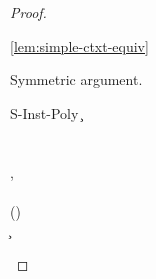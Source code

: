 \documentclass[acmsmall,screen,nonacm%
\Anonymous{,anonymous}{}%
\Final{}{,review}%
]{acmart}
\providecommand{\DIFaddbegin}{} %
\providecommand{\DIFaddend}{} %
\providecommand{\DIFdelbegin}{} %
\providecommand{\DIFdelend}{} %
\begin{document}
\begin{proof}
\begin{proofcases}
\begin{llproof}
        {\cpinst \inst \tv \tvca \cand \cpinst \inst \tv \tvcb
         \hfil {}\hfill
         \cpinst \inst \tv \tvca \cand \cunif \tvca \tvcb}
        {\cref{lem:simple-ctxt-equiv}}

      \end{llproof}

      \begin{proofcases}
	\proofcase{$\implies$}

	  \begin{llproof}
	    \vdashPf{\semenv}{\cpinst \inst \tv \tvcb}{\ditto}
	    \eqPf{\semenv(\tvca)}{\semenv(\inst)(\tv)}{\ditto}
	    \eqPf{\semenv(\tvcb)}{\semenv(\inst)(\tv)}{\ditto}
\Hand	    {}
	  \end{llproof}

	\proofcase{$\impliedby$}

	  \begin{llproof}
	    Symmetric argument.
	  \end{llproof}
      \end{proofcases}

    \DIFdelbegin %
\DIFdelend \DIFaddbegin \proofcaserewrite
      {S-Inst-Poly}
      {\cletr \x \tv {\tvs} {\ueqs \cand \c} {\C\where{\cpapp \x \tvb \tvc \inst}} \\
       \cfor \tvb \cexists {\tvbs \setminus \tvb} {\ueqs} \cequiv \ctrue \\\\
       \tvb \in \tvbs \subseteq \tv, \tvs \\
       \tvbs \disjoint \c \\
       \inst(\tvb) \disjoint \insts \C \\
       \x \disjoint \bvs \C}
      {\cletr \x \tv {\tvs} {\ueqs \cand \c} {\C\where\ctrue}}
\DIFaddend 


\end{proofcases}
\end{proof}
\end{document}
